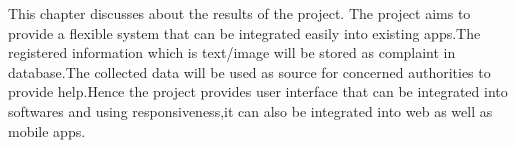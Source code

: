This chapter discusses about the results of the project. The project aims to provide a
flexible system that can be integrated easily into existing apps.The registered information which is text/image will be stored as complaint in database.The collected data will be used as source for concerned authorities to provide help.Hence the project provides user interface that can be integrated into softwares and using responsiveness,it can also be integrated into web as well as mobile apps.